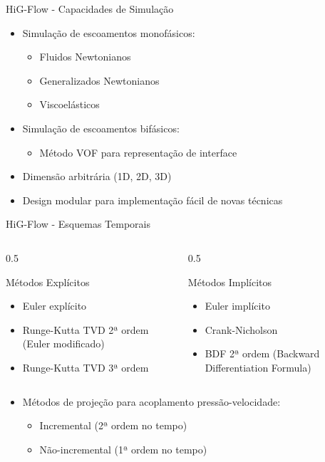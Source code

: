 \documentclass[../main/main.tex]{subfiles}
\begin{document}
\begin{frame}{HiG-Flow - Capacidades de Simulação}
  \begin{itemize}
    \item Simulação de escoamentos monofásicos:
      \begin{itemize}
        \item Fluidos Newtonianos
        \item Generalizados Newtonianos
        \item Viscoelásticos
      \end{itemize}
    \item Simulação de escoamentos bifásicos:
      \begin{itemize}
        \item Método VOF para representação de interface
      \end{itemize}
    \item Dimensão arbitrária (1D, 2D, 3D)
    \item Design modular para implementação fácil de novas técnicas
  \end{itemize}
\end{frame}

\begin{frame}{HiG-Flow - Esquemas Temporais}
  \begin{columns}[T]
    \begin{column}{0.5\textwidth}
      \begin{block}{Métodos Explícitos}
        \begin{itemize}
          \item Euler explícito
          \item Runge-Kutta TVD 2ª ordem (Euler modificado)
          \item Runge-Kutta TVD 3ª ordem
        \end{itemize}
      \end{block}
    \end{column}
    \begin{column}{0.5\textwidth}
      \begin{block}{Métodos Implícitos}
        \begin{itemize}
          \item Euler implícito
          \item Crank-Nicholson
          \item BDF 2ª ordem (Backward Differentiation Formula)
        \end{itemize}
      \end{block}
    \end{column}
  \end{columns}
  \vspace{0.5cm}
  \begin{itemize}
    \item Métodos de projeção para acoplamento pressão-velocidade:
      \begin{itemize}
        \item Incremental (2ª ordem no tempo)
        \item Não-incremental (1ª ordem no tempo)
      \end{itemize}
  \end{itemize}
\end{frame}
\end{document}
